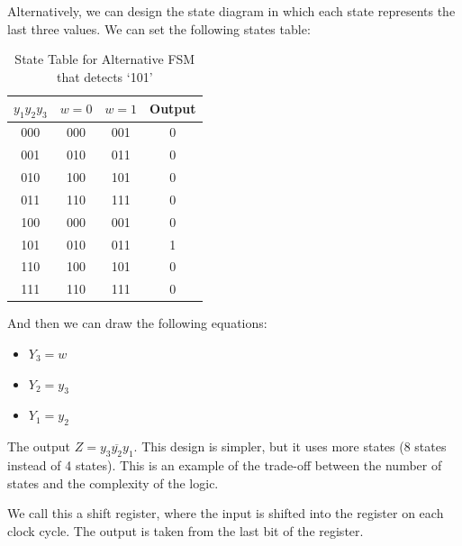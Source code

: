 \documentclass[11pt]{report}
\begin{document}
\begin{example}
    Alternatively, we can design the state diagram in which each state represents the last three values. We can set the following states table:
    \begin{table}[h!]
        \centering
        \begin{tabular}{|c|cc|c|}
            \hline
            $y_1 y_2 y_3$ & $w=0$ & $w=1$ & Output \\
            \hline
            000 & 000 & 001 & 0 \\
            001 & 010 & 011 & 0 \\
            010 & 100 & 101 & 0 \\
            011 & 110 & 111 & 0 \\
            100 & 000 & 001 & 0 \\
            101 & 010 & 011 & 1 \\
            110 & 100 & 101 & 0 \\
            111 & 110 & 111 & 0 \\
            \hline
        \end{tabular}
        \caption{State Table for Alternative FSM that detects `101'}
        \label{tab:alternative_fsm_state_table}
    \end{table}
    And then we can draw the following equations:
    \begin{itemize}
        \item $Y_3 = w$
        \item $Y_2 = y_3$
        \item $Y_1 = y_2$
    \end{itemize}
    The output $Z = y_3 \overline{y_2} y_1$.
    This design is simpler, but it uses more states (8 states instead of 4 states). This is an example of the trade-off between the number of states and the complexity of the logic.
    
    We call this a shift register, where the input is shifted into the register on each clock cycle. The output is taken from the last bit of the register.
\end{example}
\end{document}
